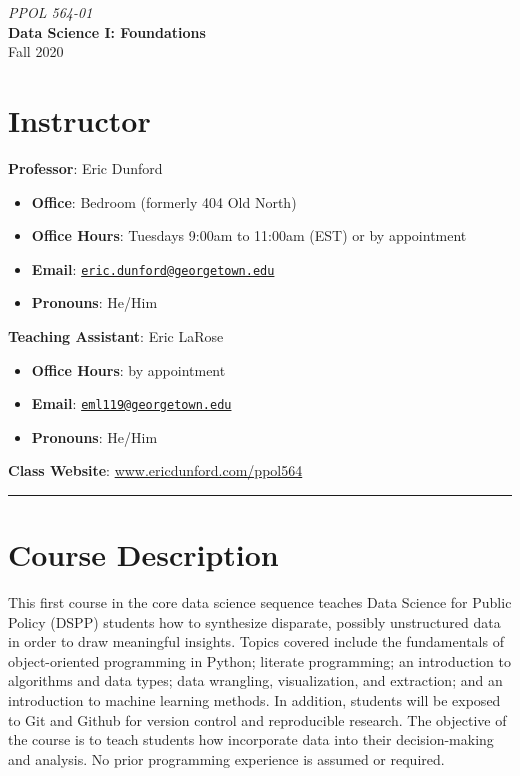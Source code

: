 \documentclass[
  12pt,
]{article}
\author{}
\date{\vspace{-2.5em}}
\providecommand{\tightlist}{%
  \setlength{\itemsep}{0pt}\setlength{\parskip}{0pt}}
\begin{document}
\begin{center}

\huge \textit{PPOL 564-01}\\
\huge\textbf{Data Science I: Foundations}\\
\Large Fall 2020

\end{center}

\hypertarget{instructor}{%
\section{Instructor}\label{instructor}}

\textbf{Professor}: Eric Dunford

\begin{itemize}
\tightlist
\item
  \textbf{Office}: Bedroom (formerly 404 Old North)
\item
  \textbf{Office Hours}: Tuesdays 9:00am to 11:00am (EST) or by
  appointment
\item
  \textbf{Email}:
  \href{mailto:eric.dunford@georgetown.edu}{\nolinkurl{eric.dunford@georgetown.edu}}
\item
  \textbf{Pronouns}: He/Him
\end{itemize}

\textbf{Teaching Assistant}: Eric LaRose

\begin{itemize}
\tightlist
\item
  \textbf{Office Hours}: by appointment
\item
  \textbf{Email}:
  \href{mailto:eml119@georgetown.edu}{\nolinkurl{eml119@georgetown.edu}}
\item
  \textbf{Pronouns}: He/Him
\end{itemize}

\textbf{Class Website}: \url{www.ericdunford.com/ppol564}

\begin{center}\rule{0.5\linewidth}{0.5pt}\end{center}

\hypertarget{course-description}{%
\section{Course Description}\label{course-description}}

This first course in the core data science sequence teaches Data Science
for Public Policy (DSPP) students how to synthesize disparate, possibly
unstructured data in order to draw meaningful insights. Topics covered
include the fundamentals of object-oriented programming in Python;
literate programming; an introduction to algorithms and data types; data
wrangling, visualization, and extraction; and an introduction to machine
learning methods. In addition, students will be exposed to Git and
Github for version control and reproducible research. The objective of
the course is to teach students how incorporate data into their
decision-making and analysis. No prior programming experience is assumed
or required.
\end{document}
